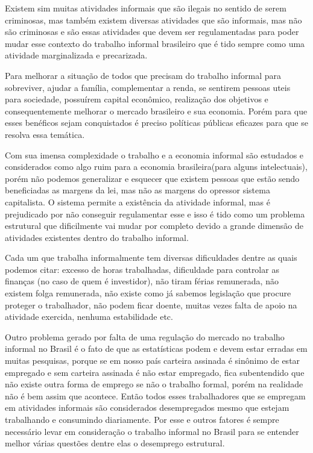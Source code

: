 Existem sim muitas atividades informais que são ilegais no sentido de serem criminosas, mas também existem diversas atividades que são informais, mas não são
criminosas e são essas atividades que devem ser regulamentadas para poder mudar esse contexto do trabalho 
informal brasileiro que é tido sempre como uma atividade marginalizada e precarizada. 

Para melhorar a situação
de todos que precisam do trabalho informal para sobreviver, ajudar a família, complementar a renda, se sentirem
pessoas uteis para sociedade, possuírem capital econômico, realização dos objetivos e consequentemente melhorar
o mercado brasileiro e sua economia. Porém para que esses benéficos sejam conquistados é preciso políticas públicas
eficazes para que se resolva essa temática.

Com sua imensa complexidade o trabalho e a economia informal são estudados e  considerados como algo ruim para 
a economia brasileira(para alguns intelectuais), porém não podemos generalizar e esquecer que existem pessoas
que estão sendo beneficiadas as margens da lei, mas não as margens do opressor sistema capitalista. O sistema 
permite a existência da atividade informal, mas é prejudicado por não conseguir regulamentar esse e isso é tido
como um problema estrutural que dificilmente vai mudar por completo devido a grande dimensão de atividades 
existentes dentro do trabalho informal.

Cada um que trabalha informalmente tem diversas dificuldades dentre as quais podemos citar: excesso de horas 
trabalhadas, dificuldade para controlar as finanças (no caso de quem é investidor), não tiram férias remunerada,
não existem folga remunerada, não existe como já sabemos legislação que procure proteger o trabalhador, não podem 
ficar doente, muitas vezes falta de apoio na atividade exercida, nenhuma estabilidade etc.

Outro problema gerado por falta de uma regulação do mercado no trabalho informal no Brasil é o fato de que as 
estatísticas podem e devem estar erradas em muitas pesquisas, porque se em nosso país carteira assinada é sinônimo 
de estar empregado e sem carteira assinada é não estar empregado, fica subentendido que não existe outra forma de 
emprego se não o trabalho formal, porém na realidade não é bem assim que acontece. Então todos esses trabalhadores 
que se empregam em atividades informais são considerados desempregados mesmo que estejam trabalhando e consumindo
diariamente. Por esse e outros fatores é sempre necessário levar em consideração o trabalho informal no Brasil 
para se entender melhor várias questões dentre elas o desemprego estrutural.

